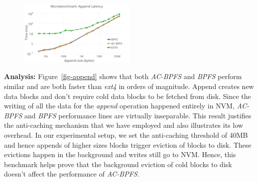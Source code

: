\begin{figure}
\centering
\vspace{-0.1in}
\includegraphics[width=0.5\textwidth]{figs/append.png}
\vspace{-0.1in}
\end{figure}

\textbf{Analysis:} Figure~\ref{fig-append} shows that both \textit{AC-BPFS} and \textit{BPFS} perform similar and are both faster than \textit{ext4} in orders of magnitude. Append creates new data blocks and don't require cold data blocks to be fetched from disk. Since the writing of all the data for the \textit{append} operation happened entirely in NVM, \textit{AC-BPFS} and \textit{BPFS} performance lines are virtually inseparable. This result justifies the anti-caching mechanism that we have employed and also illustrates its low overhead. In our experimental setup, we set the anti-caching threshold of 40MB and hence appends of higher sizes blocks trigger eviction of blocks to disk. These evictions happen in the background and writes still go to NVM. Hence, this benchmark helps prove that the background eviction of cold blocks to disk doesn't affect the performance of \textit{AC-BPFS}.

